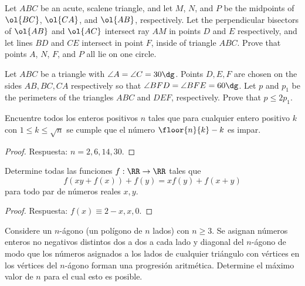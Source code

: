 
\begin{probEG}[USAMO 2008/2]
	Let $ABC$ be an acute, scalene triangle, and let $M$, $N$, and $P$ be the midpoints of $\ol{BC}$, $\ol{CA}$, and $\ol{AB}$, respectively. Let the perpendicular bisectors of $\ol{AB}$ and $\ol{AC}$ intersect ray $AM$ in points $D$ and $E$ respectively, and let lines $BD$ and $CE$ intersect in point $F$, inside of triangle $ABC$. Prove that points $A$, $N$, $F$, and $P$ all lie on one circle.
\end{probEG}


\begin{probMG}
	Let $ABC$ be a triangle with $\angle A=\angle C=30\dg$. Points $D,E,F$ are chosen on the sides $AB,BC,CA$ respectively so that $\angle BFD=\angle BFE=60\dg$. Let $p$ and $p_1$ be the perimeters of the triangles $ABC$ and $DEF$, respectively. Prove that $p\le 2p_1$.
\end{probMG}


\begin{probEG}
	Encuentre todos los enteros positivos $n$ tales que para cualquier entero positivo $k$ con $1\le k\le\sqrt{n}$ se cumple que el número $\floor{n}{k}-k$ es impar.
\end{probEG}

\begin{proof}
	Respuesta: $n=2,6,14,30$.
\end{proof}

\begin{probEG}
	Determine todas las funciones $f:\RR\to\RR$ tales que
	\[f(xy+f(x))+f(y)=xf(y)+f(x+y)\]
	para todo par de números reales $x,y$.
\end{probEG}

\begin{proof}
	Respuesta: $f(x)\equiv 2-x,x,0$.
\end{proof}

\begin{probEG}
	Considere un $n$-ágono (un polígono de $n$ lados) con $n\ge 3$. Se asignan números enteros no negativos distintos dos a dos a cada lado y diagonal del $n$-ágono de modo que los números asignados a los lados de cualquier triángulo con vértices en los vértices del $n$-ágono forman una progresión aritmética. Determine el máximo valor de $n$ para el cual esto es posible.
\end{probEG}

